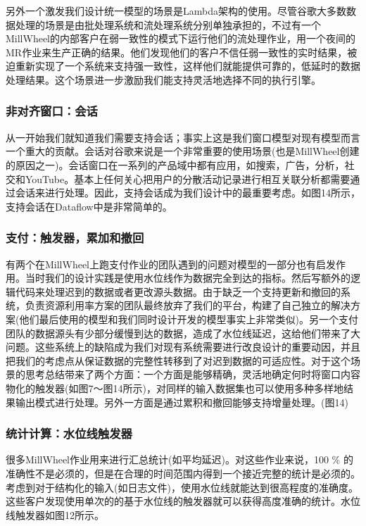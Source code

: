 \documentclass[oneside]{ctexbook}
\begin{document}
另外一个激发我们设计统一模型的场景是Lambda架构的使用。尽管谷歌大多数数据处理的场景是由批处理系统和流处理系统分别单独承担的，不过有一个MillWheel的内部客户在弱一致性的模式下运行他们的流处理作业，用一个夜间的MR作业来生产正确的结果。他们发现他们的客户不信任弱一致性的实时结果，被迫重新实现了一个系统来支持强一致性，这样他们就能提供可靠的，低延时的数据处理结果。这个场景进一步激励我们能支持灵活地选择不同的执行引擎。

\subsubsection{非对齐窗口：会话}

从一开始我们就知道我们需要支持会话；事实上这是我们窗口模型对现有模型而言一个重大的贡献。会话对谷歌来说是一个非常重要的使用场景(也是MillWheel创建的原因之一)。会话窗口在一系列的产品域中都有应用，如搜索，广告，分析，社交和YouTube。基本上任何关心把用户的分散活动记录进行相互关联分析都需要通过会话来进行处理。因此，支持会话成为我们设计中的最重要考虑。如图14所示，支持会话在Dataflow中是非常简单的。

\subsubsection{支付：触发器，累加和撤回}

有两个在MillWheel上跑支付作业的团队遇到的问题对模型的一部分也有启发作用。当时我们的设计实践是使用水位线作为数据完全到达的指标。然后写额外的逻辑代码来处理迟到的数据或者更改源头数据。由于缺乏一个支持更新和撤回的系统，负责资源利用率方案的团队最终放弃了我们的平台，构建了自己独立的解决方案(他们最后使用的模型和我们同时设计开发的模型事实上非常类似)。另一个支付团队的数据源头有少部分缓慢到达的数据，造成了水位线延迟，这给他们带来了大问题。这些系统上的缺陷成为我们对现有系统需要进行改良设计的重要动因，并且把我们的考虑点从保证数据的完整性转移到了对迟到数据的可适应性。对于这个场景的思考总结带来了两个方面：一个方面是能够精确，灵活地确定何时将窗口内容物化的触发器(如图7～图14所示)，对同样的输入数据集也可以使用多种多样地结果输出模式进行处理。另外一方面是通过累积和撤回能够支持增量处理。(图14)

\subsubsection{统计计算：水位线触发器}

很多MillWheel作业用来进行汇总统计(如平均延迟)。对这些作业来说，100 \% 的准确性不是必须的，但是在合理的时间范围内得到一个接近完整的统计是必须的。考虑到对于结构化的输入(如日志文件)，使用水位线就能达到很高程度的准确度。这些客户发现使用单次的的基于水位线的触发器就可以获得高度准确的统计。水位线触发器如图12所示。
\end{document}
